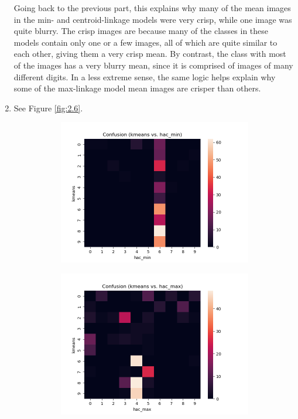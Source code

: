 \documentclass[submit]{harvardml}
\begin{document}
\begin{enumerate}
	Going back to the previous part, this explains why many of the mean images in the min- and centroid-linkage models were very crisp, while one image was quite blurry. The crisp images are because many of the classes in these models contain only one or a few images, all of which are quite similar to each other, giving them a very crisp mean. By contrast, the class with most of the images has a very blurry mean, since it is comprised of images of many different digits. In a less extreme sense, the same logic helps explain why some of the max-linkage model mean images are crisper than others.
	
	\item See Figure \ref{fig:2.6}.
	
	\begin{figure}[h]
		\centering
		\begin{subfigure}[b]{0.475\textwidth}
			\includegraphics[width=\textwidth]{kmeans_hac_min_confusion}
		\end{subfigure}
		\hfill
		\begin{subfigure}[b]{0.475\textwidth}
			\includegraphics[width=\textwidth]{kmeans_hac_max_confusion}

\end{subfigure}
\end{figure}
\end{enumerate}
\end{document}
